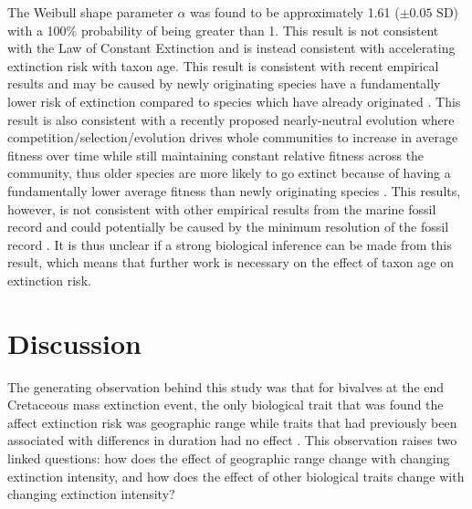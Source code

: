 \documentclass[11pt]{article}
\begin{document}
The Weibull shape parameter \(\alpha\) was found to be approximately 1.61 (\(\pm 0.05\) SD) with a 100\% probability of being greater than 1. This result is not consistent with the Law of Constant Extinction \citep{VanValen1973} and is instead consistent with accelerating extinction risk with taxon age. This result is consistent with recent empirical results and may be caused by newly originating species have a fundamentally lower risk of extinction compared to species which have already originated \citep{Wagner2014b,Quental2013,Smits2015}. This result is also consistent with a recently proposed nearly-neutral evolution where competition/selection/evolution drives whole communities to increase in average fitness over time while still maintaining constant relative fitness across the community, thus older species are more likely to go extinct because of having a fundamentally lower average fitness than newly originating species \citep{Rosindell2015a}. This results, however, is not consistent with other empirical results from the marine fossil record \citep{Finnegan2008,Crampton2016} and could potentially be caused by the minimum resolution of the fossil record \citep{Sepkoski1975}. It is thus unclear if a strong biological inference can be made from this result, which means that further work is necessary on the effect of taxon age on extinction risk.



\section*{Discussion}



The generating observation behind this study was that for bivalves at the end Cretaceous mass extinction event, the only biological trait that was found the affect extinction risk was geographic range while traits that had previously been associated with differencs in duration had no effect \citep{Jablonski1986}. This observation raises two linked questions: how does the effect of geographic range change with changing extinction intensity, and how does the effect of other biological traits change with changing extinction intensity?
\end{document}
